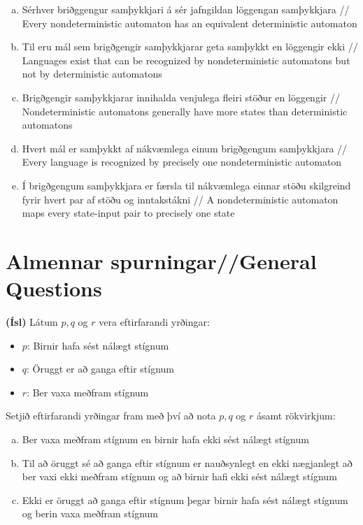 \documentclass[addpoints]{exam}
\begin{document}
\begin{questions}
\begin{enumerate}[a)]
    \item Sérhver briðggengur samþykkjari á sér jafngildan löggengan samþykkjara // Every nondeterministic automaton has an equivalent deterministic automaton %
    \item Til eru mál sem brigðgengir samþykkjarar geta samþykkt en löggengir ekki // Languages exist that can be recognized by nondeterministic automatons but not by deterministic automatons
    \item Brigðgengir samþykkjarar innihalda venjulega fleiri stöður en löggengir // Nondeterministic automatons generally have more states than deterministic automatons
    \item Hvert mál er samþykkt af nákvæmlega einum brigðgengum samþykkjara // Every language is recognized by precisely one nondeterministic automaton
    \item Í brigðgengum samþykkjara er færsla til nákvæmlega einnar stöðu skilgreind fyrir hvert par af stöðu og inntakstákni // A nondeterministic automaton maps every state-input pair to precisely one state
\end{enumerate}

\newpage
\section{Almennar spurningar//General Questions}

\question[10]

\textbf{(Ísl)} Látum $p, q$ og $r$ vera eftirfarandi yrðingar:

\begin{itemize}
    \item[] $p$: Birnir hafa sést nálægt stígnum
    \item[] $q$: Öruggt er að ganga eftir stígnum
    \item[] $r$: Ber vaxa meðfram stígnum
\end{itemize}

Setjið eftirfarandi yrðingar fram með því að nota $p, q$ og $r$ ásamt rökvirkjum:

\begin{enumerate}[a)]
    \item Ber vaxa meðfram stígnum en birnir hafa ekki sést nálægt stígnum
    \item Til að öruggt sé að ganga eftir stígnum er nauðsynlegt en ekki nægjanlegt að ber vaxi ekki meðfram stígnum og að birnir hafi ekki sést nálægt stígnum
    \item Ekki er öruggt að ganga eftir stígnum þegar birnir hafa sést nálægt stígnum og berin vaxa meðfram stígnum
\end{enumerate}


\end{questions}
\end{document}
